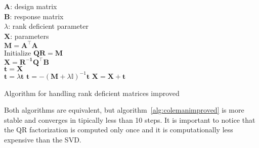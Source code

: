 \begin{algorithm}[H]
\begin{algorithmic}[1]
\REQUIRE $\,$ \\
$\mathbf{A}$: design matrix \\
$\mathbf{B}$: response matrix \\
$\lambda$: rank deficient parameter \\
\ENSURE  $\,$ \\
$\mathbf{X}$: parameters \\
\STATE $\mathbf{M}=\mathbf{A^\top A}$ \\
\STATE Initialize $\mathbf{Q R}=\mathbf{M}$ \\
\STATE $\mathbf{X} = \mathbf{R^{-1}Q^\top B}$ \\
\STATE $\mathbf{t} = \mathbf{X}$ \\
        \STATE $\mathbf{t} =\lambda \mathbf{t}$  
        \STATE $\mathbf{t} =  -(\mathbf{M}+\lambda\mathbb{I})^{-1}\mathbf{t}$
	\STATE $\mathbf{X}=\mathbf{X} + \mathbf{t}$
\ENDFOR
\end{algorithmic}
\caption{Algorithm for handling rank deficient matrices improved}
\label{alg:colemanimproved}
\end{algorithm}

Both algorithms are equivalent, but algorithm~\ref{alg:colemanimproved} is more
stable and converges in tipically less than 10 steps.
It is important to notice that the QR factorization is computed only once and it
is computationally less expensive than the SVD.







